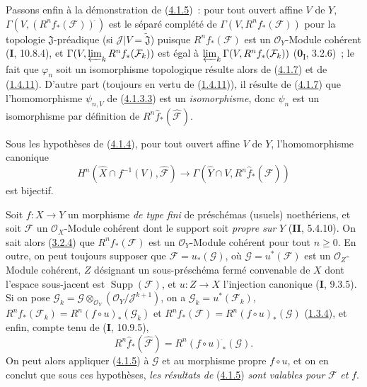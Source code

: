 \begin{env}[4.1.8]
\label{III.4.1.8-fr}
Passons enfin à la démonstration de (\hyperref[III.4.1.5-fr]{4.1.5})~:
pour tout ouvert affine $V$ de $Y$,
$\Gamma(V,(R^nf_*(\mathcal F))^{\widehat{\,}})$ est le séparé complété de
$\Gamma(V,R^nf_*(\mathcal F))$ pour la topologie $\mathfrak J$-préadique
(si $\mathcal J|V=\widetilde{\mathfrak J}$) puisque
$R^nf_*(\mathcal F)$ est un $\mathcal O_Y$-Module cohérent (\textbf{I}, 10.8.4),
et $\Gamma(V,\varprojlim_kR^nf_*(\mathcal F_k))$ est égal à
$\varprojlim_k\Gamma(V,R^nf_*(\mathcal F_k))$
(\textbf{0}\textsubscript{I}, 3.2.6)~; le fait que $\varphi_n$ soit un isomorphisme
topologique résulte alors de (\hyperref[III.4.1.7-fr]{4.1.7}) et de
(\hyperref[III.1.4.11-fr]{1.4.11}). D'autre part (toujours en vertu de
(\hyperref[III.1.4.11-fr]{1.4.11})), il résulte de
(\hyperref[III.4.1.7-fr]{4.1.7}) que l'homomorphisme $\psi_{n,V}$ de
(\hyperref[III.4.1.3.3-fr]{4.1.3.3}) est un \emph{isomorphisme}, donc $\psi_n$
est un isomorphisme par définition de
$R^n\widehat f_*(\widehat{\mathcal F})$.
\end{env}

\begin{corollary}[4.1.9]
\label{III.4.1.9-fr}
Sous les hypothèses de \textup{(\hyperref[III.4.1.4-fr]{4.1.4})}, pour tout ouvert
affine $V$ de $Y$, l'homomorphisme canonique
\[
H^n(\widehat X\cap f^{-1}(V),\widehat{\mathcal F})
\longrightarrow\Gamma(\widehat Y\cap V,
R^n\widehat f_*(\widehat{\mathcal F}))
\]
est bijectif.
\end{corollary}

\begin{remark}[4.1.10]
\label{III.4.1.10-fr}
\upshape
Soit $f:X\to Y$ un morphisme \emph{de type fini} de préschémas (usuels)
noethériens, et soit $\mathcal F$ un $\mathcal O_X$-Module cohérent dont le
support soit \emph{propre sur} $Y$ (\textbf{II}, 5.4.10). On sait alors
(\hyperref[III.3.2.4-fr]{3.2.4}) que $R^nf_*(\mathcal F)$ est un
$\mathcal O_Y$-Module cohérent pour tout $n\geq0$. En outre, on peut
toujours supposer que $\mathcal F=u_*(\mathcal G)$, où
$\mathcal G=u^*(\mathcal F)$ est un $\mathcal O_Z$-Module cohérent, $Z$
désignant un sous-préschéma fermé convenable de $X$ dont l'espace
sous-jacent est $\operatorname{Supp}(\mathcal F)$, et $u:Z\to X$
l'injection canonique (\textbf{I}, 9.3.5). Si on pose
$\mathcal G_k=\mathcal G\otimes_{\mathcal O_Y}
(\mathcal O_Y/\mathcal J^{k+1})$,
on a $\mathcal G_k=u^*(\mathcal F_k)$,
$R^nf_*(\mathcal F_k)=R^n(f\circ u)_*(\mathcal G_k)$ et
$R^nf_*(\mathcal F)=R^n(f\circ u)_*(\mathcal G)$
(\hyperref[III.1.3.4-fr]{1.3.4}), et enfin, compte tenu de (\textbf{I}, 10.9.5),
\[
R^n\widehat f_*(\widehat{\mathcal F})
=R^n(f\circ u)^{\widehat{\,}}_*(\mathcal G).
\]
On peut alors appliquer (\hyperref[III.4.1.5-fr]{4.1.5}) à $\mathcal G$ et
au morphisme propre $f\circ u$, et on en conclut que sous ces hypothèses,
\emph{les résultats de} (\hyperref[III.4.1.5-fr]{4.1.5}) \emph{sont valables pour}
$\mathcal F$ \emph{et} $f$.
\end{remark}

